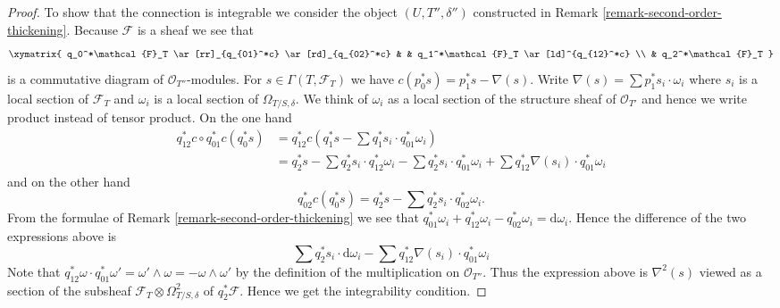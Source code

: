 \begin{proof}
\medskip\noindent
To show that the connection is integrable we consider the
object $(U, T'', \delta'')$ constructed in
Remark \ref{remark-second-order-thickening}.
Because $\mathcal{F}$ is a sheaf we see that
$$
\xymatrix{
q_0^*\mathcal{F}_T \ar[rr]_{q_{01}^*c} \ar[rd]_{q_{02}^*c} & &
q_1^*\mathcal{F}_T \ar[ld]^{q_{12}^*c} \\
& q_2^*\mathcal{F}_T
}
$$
is a commutative diagram of $\mathcal{O}_{T''}$-modules. For
$s \in \Gamma(T, \mathcal{F}_T)$ we have
$c(p_0^*s) = p_1^*s - \nabla(s)$. Write
$\nabla(s) = \sum p_1^*s_i \cdot \omega_i$ where $s_i$ is a local section
of $\mathcal{F}_T$ and $\omega_i$ is a local section of $\Omega_{T/S, \delta}$.
We think of $\omega_i$ as a local section of the structure
sheaf of $\mathcal{O}_{T'}$ and hence we write product instead of tensor
product. On the one hand
\begin{align*}
q_{12}^*c \circ q_{01}^*c(q_0^*s) & = 
q_{12}^*c(q_1^*s - \sum q_1^*s_i \cdot q_{01}^*\omega_i) \\
& =
q_2^*s - \sum q_2^*s_i \cdot q_{12}^*\omega_i -
\sum q_2^*s_i \cdot q_{01}^*\omega_i +
\sum q_{12}^*\nabla(s_i) \cdot q_{01}^*\omega_i
\end{align*}
and on the other hand
$$
q_{02}^*c(q_0^*s) = q_2^*s - \sum q_2^*s_i \cdot q_{02}^*\omega_i.
$$
From the formulae of Remark \ref{remark-second-order-thickening} we see
that
$q_{01}^*\omega_i + q_{12}^*\omega_i - q_{02}^*\omega_i = \text{d}\omega_i$.
Hence the difference of the two expressions above is
$$
\sum q_2^*s_i \cdot \text{d}\omega_i -
\sum q_{12}^*\nabla(s_i) \cdot q_{01}^*\omega_i
$$
Note that
$q_{12}^*\omega \cdot q_{01}^*\omega' = \omega' \wedge \omega =
- \omega \wedge \omega'$ by the definition of the multiplication on
$\mathcal{O}_{T''}$. Thus the expression above is $\nabla^2(s)$ viewed
as a section of the subsheaf $\mathcal{F}_T \otimes \Omega^2_{T/S, \delta}$ of
$q_2^*\mathcal{F}$. Hence we get the integrability condition.
\end{proof}